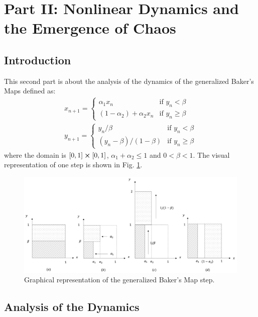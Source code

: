 \documentclass[11pt,titlepage]{article}
\begin{document}
\newpage
\section{Part II: Nonlinear Dynamics and the Emergence of Chaos}


\subsection{Introduction} %
This second part is about the analysis of the dynamics of the generalized Baker's Maps defined as:
\begin{equation} \label{eq_map}
	\begin{gathered}
		x_{n+1} = 
		\begin{cases}
			\alpha_1 x_n & \text{if } y_n < \beta \\
			(1-\alpha_2) + \alpha_2 x_n & \text{if } y_n \ge \beta
		\end{cases}
	\\
	y_{n+1} = 
	\begin{cases}
		y_n/\beta & \text{if } y_n < \beta \\
		(y_n -\beta)/(1-\beta) & \text{if } y_n \ge \beta
	\end{cases}
	\end{gathered}
\end{equation}
where the domain is $[0,1] \cross [0,1]$, $\alpha_1 + \alpha_2\le 1$ and $0<\beta<1$. The visual representation of one step is shown in Fig.  \ref{fig14}.
\begin{center}
	\begin{figure} [h]
		\centering
		\includegraphics[width = 6in]{./figures/baker_map.png}
		\caption{Graphical representation of the generalized Baker's Map step.}
		\label{fig14}
	\end{figure}
\end{center}
\subsection{Analysis of the Dynamics}
\end{document}

